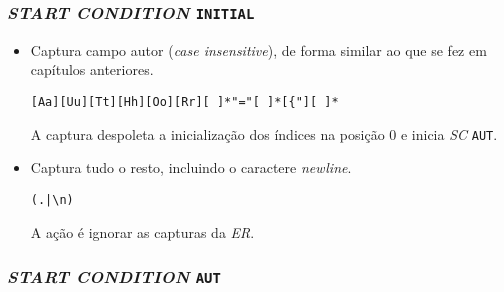 \subsubsection{\emph{START CONDITION} \texttt{INITIAL}}

\begin{itemize}
	\item Captura campo autor (\emph{case insensitive}), de forma similar ao que
		se fez em capítulos anteriores. 
\begin{verbatim}
[Aa][Uu][Tt][Hh][Oo][Rr][ ]*"="[ ]*[{"][ ]*
\end{verbatim}

A captura despoleta a inicialização dos índices na posição 0 e inicia
\emph{SC} \texttt{AUT}.  

\item Captura tudo o resto, incluindo o caractere \emph{newline}.  
\begin{verbatim}
(.|\n)
\end{verbatim}

A ação é ignorar as capturas da \emph{ER}.

\end{itemize}


\subsubsection{\emph{START CONDITION} \texttt{AUT}}

